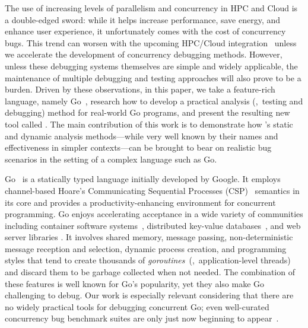 The use of increasing levels of parallelism and concurrency in HPC and Cloud is a double-edged sword: while it helps increase performance, save energy, and enhance user experience, it
unfortunately comes with the cost of concurrency bugs.
%
This trend can worsen with the upcoming HPC/Cloud
integration~\cite{dan-herbein-dong} unless we accelerate the
development of concurrency debugging methods.
%
However, unless these debugging systems themselves are
simple and widely applicable, the maintenance of multiple debugging and testing approaches will also prove to be a burden.
%
Driven by these observations, in this paper, we take a feature-rich language, namely Go~\cite{go}, research how to develop a practical analysis (\ie,~testing and debugging) method for real-world Go programs, and present the resulting new tool called \goat.
%
The main contribution of this work is to demonstrate how
\goat's static and dynamic analysis methods---while very well known
by their names and effectiveness in simpler contexts---can
be brought to bear on realistic bug scenarios in the setting of
a complex language such as Go.

Go~\cite{go} is a statically typed language initially developed by Google.
%
It employs channel-based Hoare's Communicating Sequential Processes (CSP)~\cite{hoare-csp78} semantics in its core and provides a productivity-enhancing environment for concurrent programming.
%
Go enjoys accelerating acceptance in a wide variety of
communities including container software systems~\cite{merkel2014docker,kubernetes},  distributed key-value databases~\cite{etcd,cockroachdb-sigmod20}, and web server libraries \cite{grpc}.
%
It involves shared memory, message passing, non-deterministic message reception and selection, dynamic process creation, and programming styles that tend to create thousands of \textit{goroutines}~(\ie,~application-level threads) and discard them to be garbage collected when not needed.
%
The combination of these features is well known for Go's popularity, yet they also make Go challenging to debug.
%
Our work is especially relevant considering that there are no widely practical tools for debugging concurrent Go; even well-curated
concurrency bug benchmark suites are only just now beginning to appear~\cite{tu-concurrentBugs-asplos19,yuan-gobench-cgo21}.
%

